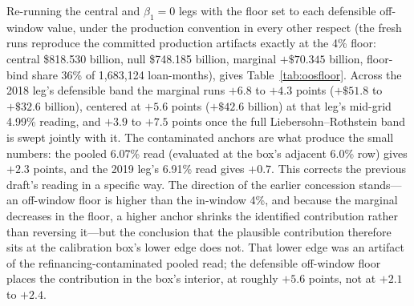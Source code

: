 \documentclass[12pt]{article}
\begin{document}
Re-running the central and $\beta_1 = 0$ legs with the floor set to each defensible off-window value, under the production convention in every other respect (the fresh runs reproduce the committed production artifacts exactly at the 4\% floor: central \$818.530 billion, null \$748.185 billion, marginal $+\$70.345$ billion, floor-bind share 36\% of 1,683,124 loan-months), gives Table~\ref{tab:oosfloor}. Across the 2018 leg's defensible band the marginal runs $+6.8$ to $+4.3$ points ($+\$51.8$ to $+\$32.6$ billion), centered at $+5.6$ points ($+\$42.6$ billion) at that leg's mid-grid 4.99\% reading, and $+3.9$ to $+7.5$ points once the full Liebersohn--Rothstein band is swept jointly with it. The contaminated anchors are what produce the small numbers: the pooled 6.07\% read (evaluated at the box's adjacent 6.0\% row) gives $+2.3$ points, and the 2019 leg's 6.91\% read gives $+0.7$. This corrects the previous draft's reading in a specific way. The direction of the earlier concession stands---an off-window floor is higher than the in-window 4\%, and because the marginal decreases in the floor, a higher anchor shrinks the identified contribution rather than reversing it---but the conclusion that the plausible contribution therefore sits at the calibration box's lower edge does not. That lower edge was an artifact of the refinancing-contaminated pooled read; the defensible off-window floor places the contribution in the box's interior, at roughly $+5.6$ points, not at $+2.1$ to $+2.4$.
\end{document}
